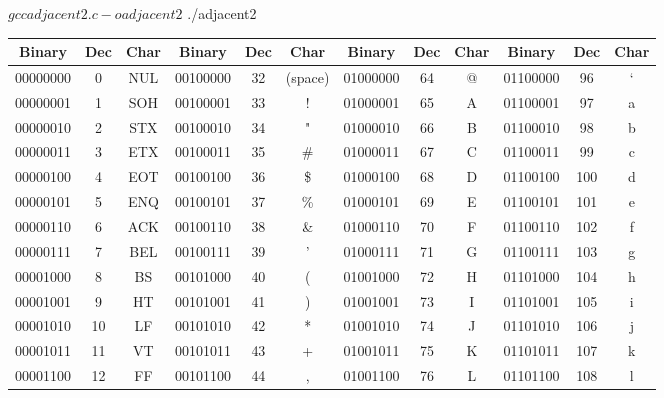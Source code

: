 \documentclass[12pt, oneside, landscape]{article}
\begin{document}


\begin{shell}
    $ gcc adjacent2.c -o adjacent2
    $ ./adjacent2
    \end{shell}
    
    \vspace{8em}
    

\tiny
\begin{center}
    \begin{tabular}{|ccc|ccc|ccc|ccc|}
    \hline
    \textbf{Binary} & \textbf{Dec} & \textbf{Char} & \textbf{Binary} & \textbf{Dec} & \textbf{Char} & \textbf{Binary} & \textbf{Dec} & \textbf{Char} & \textbf{Binary} & \textbf{Dec} & \textbf{Char} \\
    \hline
    00000000 & 0  & NUL  & 00100000 & 32 & (space)   & 01000000 & 64 & @   & 01100000 & 96  & `   \\
    00000001 & 1  & SOH  & 00100001 & 33 & !         & 01000001 & 65 & A   & 01100001 & 97  & a   \\
    00000010 & 2  & STX  & 00100010 & 34 & "         & 01000010 & 66 & B   & 01100010 & 98  & b   \\
    00000011 & 3  & ETX  & 00100011 & 35 & \#        & 01000011 & 67 & C   & 01100011 & 99  & c   \\
    00000100 & 4  & EOT  & 00100100 & 36 & \$        & 01000100 & 68 & D   & 01100100 & 100 & d   \\
    00000101 & 5  & ENQ  & 00100101 & 37 & \%        & 01000101 & 69 & E   & 01100101 & 101 & e   \\
    00000110 & 6  & ACK  & 00100110 & 38 & \&        & 01000110 & 70 & F   & 01100110 & 102 & f   \\
    00000111 & 7  & BEL  & 00100111 & 39 & '         & 01000111 & 71 & G   & 01100111 & 103 & g   \\
    00001000 & 8  & BS   & 00101000 & 40 & (         & 01001000 & 72 & H   & 01101000 & 104 & h   \\
    00001001 & 9  & HT   & 00101001 & 41 & )         & 01001001 & 73 & I   & 01101001 & 105 & i   \\
    00001010 & 10 & LF   & 00101010 & 42 & *         & 01001010 & 74 & J   & 01101010 & 106 & j   \\
    00001011 & 11 & VT   & 00101011 & 43 & +         & 01001011 & 75 & K   & 01101011 & 107 & k   \\
    00001100 & 12 & FF   & 00101100 & 44 & ,         & 01001100 & 76 & L   & 01101100 & 108 & l   \\

\end{tabular}
\end{center}
\end{document}
